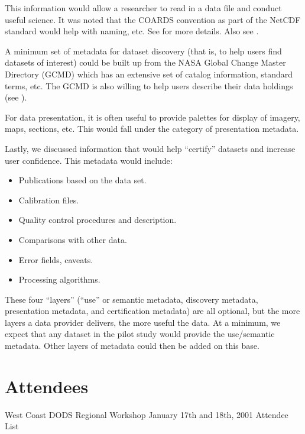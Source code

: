 This information would allow a researcher to read in a data file and
conduct useful science.  It was noted that the COARDS convention as
part of the NetCDF standard would help with naming, etc.  See
 for more
details.  Also see
.

A minimum set of metadata for dataset discovery (that is, to help
users find datasets of interest) could be built up from the NASA
Global Change Master Directory (GCMD) which has an extensive set of
catalog information, standard terms, etc.  The GCMD is also willing to
help users describe their data holdings (see
).

For data presentation, it is often useful to provide palettes for
display of imagery, maps, sections, etc.  This would fall under the
category of presentation metadata.

Lastly, we discussed information that would help ``certify'' datasets
and increase user confidence.  This metadata would include:
\begin{itemize}
\item Publications based on the data set.
\item Calibration files.
\item Quality control procedures and description.
\item Comparisons with other data.
\item Error fields, caveats.
\item Processing algorithms.
\end{itemize}

These four ``layers'' (``use'' or semantic metadata, discovery metadata,
presentation metadata, and certification metadata) are all optional,
but the more layers a data provider delivers, the more useful the
data.  At a minimum, we expect that any dataset in the pilot study
would provide the use/semantic metadata.  Other layers of metadata
could then be added on this base.


\section{Attendees}
\label{II,attendees}

\begin{center}
West Coast DODS Regional Workshop
January 17th and 18th, 2001
Attendee List
\end{center}

